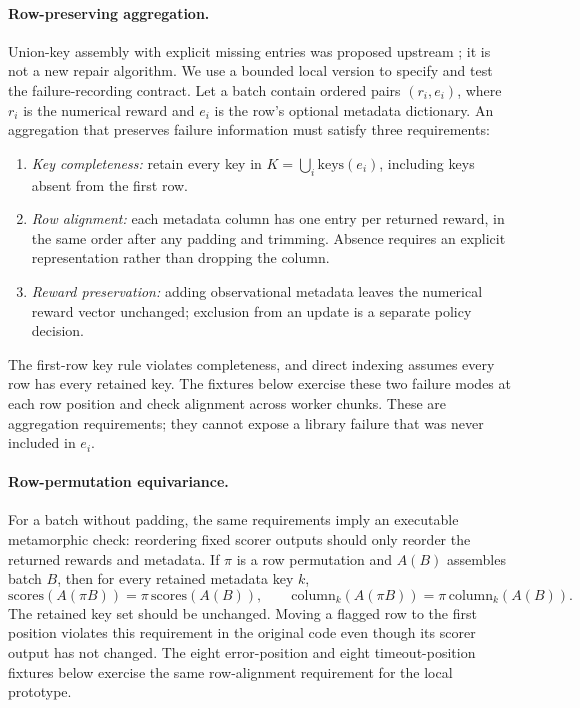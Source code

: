\documentclass[10pt,a4paper]{article}
\let\cite\citep
\begin{document}
\paragraph{Row-preserving aggregation.}
Union-key assembly with explicit missing entries was proposed upstream
\cite{verl6545,verl7151}; it is not a new repair algorithm. We use a
bounded local version to specify and test the failure-recording contract.
Let a batch contain ordered pairs $(r_i,e_i)$, where $r_i$ is the numerical
reward and $e_i$ is the row's optional metadata dictionary. An aggregation
that preserves failure information must satisfy three requirements:
\begin{enumerate}[nosep,leftmargin=*]
\item \emph{Key completeness:} retain every key in
      $K=\bigcup_i \mathrm{keys}(e_i)$, including keys absent from the first row.
\item \emph{Row alignment:} each metadata column has one entry per returned
      reward, in the same order after any padding and trimming. Absence
      requires an explicit representation rather than dropping the column.
\item \emph{Reward preservation:} adding observational metadata leaves
      the numerical reward vector unchanged; exclusion from an update is
      a separate policy decision.
\end{enumerate}
The first-row key rule violates completeness, and direct indexing assumes
every row has every retained key. The fixtures below exercise these two
failure modes at each row position and check alignment across worker
chunks. These are aggregation requirements; they cannot expose a library
failure that was never included in $e_i$.

\paragraph{Row-permutation equivariance.}
For a batch without padding, the same requirements imply an executable
metamorphic check: reordering fixed scorer outputs should only reorder
the returned rewards and metadata. If $\pi$ is a row permutation and
$A(B)$ assembles batch $B$, then for every retained metadata key $k$,
\[
 \mathrm{scores}(A(\pi B))=\pi\,\mathrm{scores}(A(B)),\qquad
 \mathrm{column}_k(A(\pi B))=\pi\,\mathrm{column}_k(A(B)).
\]
The retained key set should be unchanged. Moving a flagged row to the
first position violates this requirement in the original code even
though its scorer output has not changed. The eight error-position and
eight timeout-position fixtures below exercise the same row-alignment
requirement for the local prototype.
\end{document}
